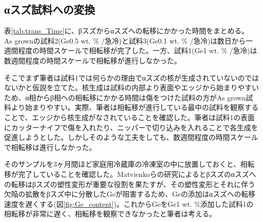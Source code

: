 \subsection{αスズ試料への変換}
表\ref{tab:trans_Time}に、βスズからαスズへの転移にかかった時間をまとめる。
As grownの試料2(Ge0.5 wt. \% /急冷)と試料3(Ge0.1 wt. \% /急冷)は数日から一週間程度の時間スケールで相転移が完了した。一方、試料1(Ge1 wt. \% /急冷)は数週間程度の時間スケールで相転移が進行しなかった。

そこでまず筆者は試料1では何らかの理由でαスズの核が生成されていないのではないかと仮説を立てた。核生成は試料の内部より表面やエッジから始まりやすい\cite{Cornelius}ため、α相からβ相への相転移にかかる時間は傷をつけた試料の方がAs grown試料より始まりやすい。実際、筆者は相転移が進行している最中の試料を観察することで、エッジから核生成がなされていることを確認した。筆者は試料1の表面にカッターナイフで傷を入れたり、ニッパーで切り込みを入れることで各生成を促進しようとした。しかしそのような工夫をしても、数週間程度の時間スケールで相転移は進行しなかった。

そのサンプルを3ヶ月間ほど家庭用冷蔵庫の冷凍室の中に放置しておくと、相転移が完了していることを確認した。Matvienkoらの研究によるとβスズのαスズへの転移はβスズの塑性変形が重要な役割を果たすが、その塑性変形とそれに伴う欠陥の拡散をβスズ中に分散したGeが阻害するため、Geの添加はαスズへの転移速度を遅くする\cite{Matvienko}(図\ref{fig:Ge_content})。これからGeをGe1 wt. \%添加した試料1の相転移が非常に遅く、相転移を観察できなかったと筆者は考える。

